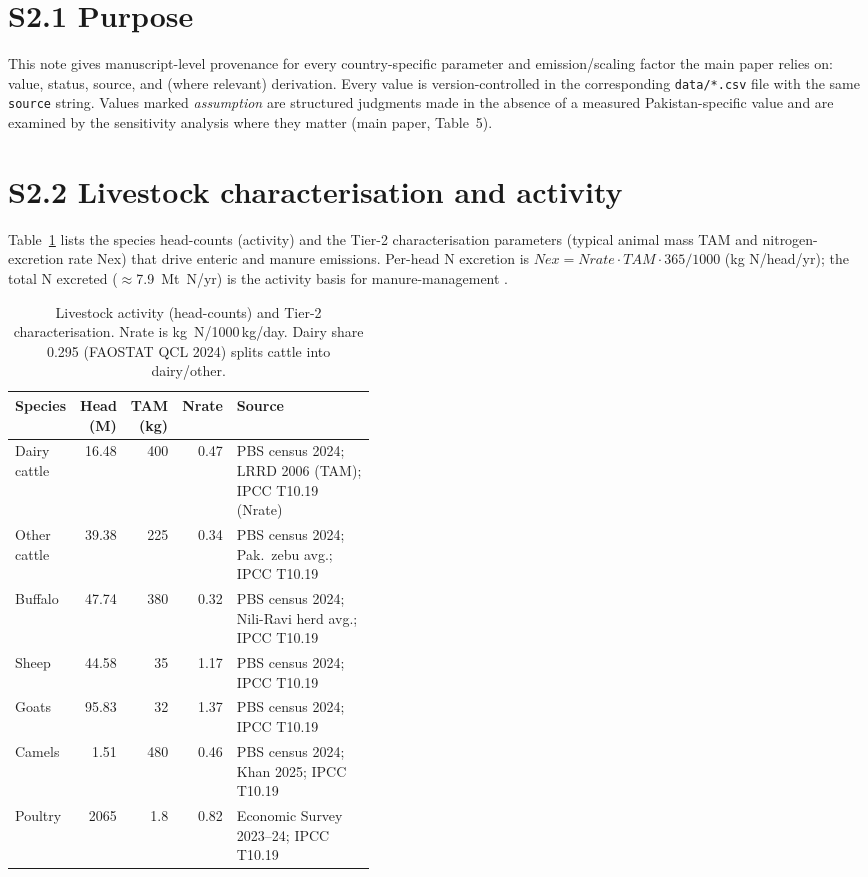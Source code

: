 
\section*{S2.1 Purpose}

This note gives manuscript-level provenance for every country-specific parameter and
emission/scaling factor the main paper relies on: value, status, source, and (where
relevant) derivation. Every value is version-controlled in the corresponding
\texttt{data/*.csv} file with the same \texttt{source} string. Values marked
\emph{assumption} are structured judgments made in the absence of a measured
Pakistan-specific value and are examined by the sensitivity analysis where they
matter (main paper, Table~5).

\section*{S2.2 Livestock characterisation and activity}

Table~\ref{tab:s2live} lists the species head-counts (activity) and the Tier-2
characterisation parameters (typical animal mass TAM and nitrogen-excretion rate
Nex) that drive enteric and manure emissions. Per-head N excretion is
$Nex = Nrate \cdot TAM \cdot 365/1000$ (kg N/head/yr); the total N excreted
($\approx$7.9~Mt~N/yr) is the activity basis for manure-management \NtwoO{}.

\begin{table}[!htbp]
\centering
\footnotesize
\setlength{\tabcolsep}{4pt}
\begin{tabular}{@{}lrrrp{0.42\linewidth}@{}}
\toprule
\textbf{Species} & \textbf{Head (M)} & \textbf{TAM (kg)} & \textbf{Nrate} & \textbf{Source} \\
\midrule
Dairy cattle & 16.48 & 400 & 0.47 & PBS census 2024; LRRD 2006 (TAM); IPCC T10.19 (Nrate) \\
Other cattle & 39.38 & 225 & 0.34 & PBS census 2024; Pak.\ zebu avg.; IPCC T10.19 \\
Buffalo      & 47.74 & 380 & 0.32 & PBS census 2024; Nili-Ravi herd avg.; IPCC T10.19 \\
Sheep        & 44.58 & 35  & 1.17 & PBS census 2024; IPCC T10.19 \\
Goats        & 95.83 & 32  & 1.37 & PBS census 2024; IPCC T10.19 \\
Camels       &  1.51 & 480 & 0.46 & PBS census 2024; Khan 2025; IPCC T10.19 \\
Poultry      & 2065  & 1.8 & 0.82 & Economic Survey 2023--24; IPCC T10.19 \\
\bottomrule
\end{tabular}
\caption{Livestock activity (head-counts) and Tier-2 characterisation. Nrate is
kg~N/1000\,kg/day. Dairy share 0.295 (FAOSTAT QCL 2024) splits cattle into
dairy/other.}
\label{tab:s2live}
\end{table}

